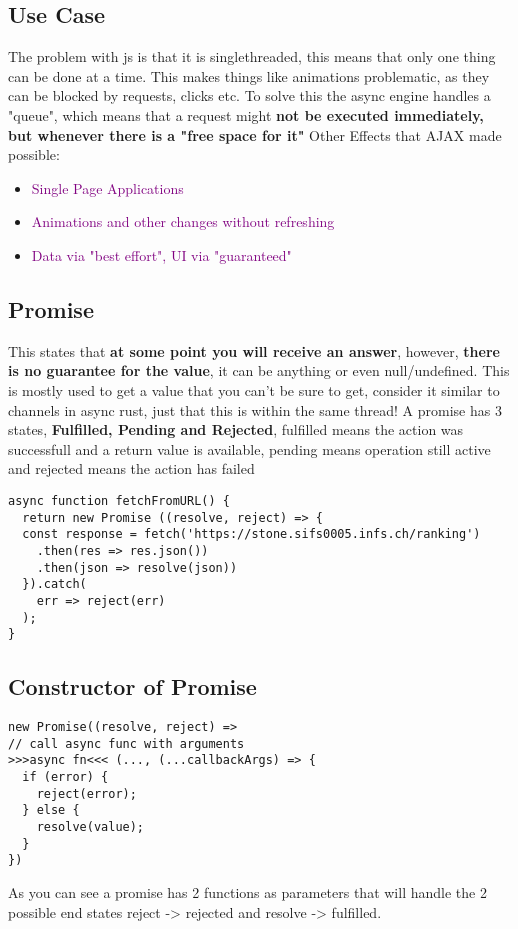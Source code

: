 \documentclass[main.tex,fontsize=6pt,paper=a4,paper=landscape,DIV=calc,]{scrartcl}
\begin{document}
\begin{multicols*}{4}
\subsection{Use Case}  
The problem with js is that it is singlethreaded, this means that only one thing can be done at a time.\newline
This makes things like animations problematic, as they can be blocked by requests, clicks etc.\newline
To solve this the async engine handles a "queue", which means that a request might \textbf{not be executed immediately, but whenever there is a "free space for it"}\newline
Other Effects that AJAX made possible:
\begin{itemize}
\item \textcolor{purple}{Single Page Applications}
\item \textcolor{purple}{Animations and other changes without refreshing}
\item \textcolor{purple}{Data via "best effort", UI via "guaranteed"}
\end{itemize} 

\subsection{Promise}  
This states that \textbf{at some point you will receive an answer}, however, \textbf{there is no guarantee for the value}, it can be anything or even null/undefined.\newline
This is mostly used to get a value that you can't be sure to get, consider it similar to channels in async rust, just that this is within the same thread!\newline
\textcolor{OliveGreen}{A promise has 3 states, \textbf{Fulfilled, Pending and Rejected}, fulfilled means the action was successfull and a return value is available, pending means operation still active and rejected means the action has failed}
\vspace{-2mm}
\begin{lstlisting}
async function fetchFromURL() {
  return new Promise ((resolve, reject) => {
  const response = fetch('https://stone.sifs0005.infs.ch/ranking')
    .then(res => res.json())
    .then(json => resolve(json))
  }).catch(
    err => reject(err)
  );
}
\end{lstlisting}
\vspace{2mm}

\subsection{Constructor of Promise}  
\vspace{-2mm}
\begin{lstlisting}
new Promise((resolve, reject) =>
// call async func with arguments
>>>async fn<<< (..., (...callbackArgs) => {
  if (error) {
    reject(error);
  } else {
    resolve(value);
  }
})
\end{lstlisting}
\vspace{2mm}
As you can see a promise has 2 functions as parameters that will handle the 2 possible end states reject -> rejected and resolve -> fulfilled.


\end{multicols*}
\end{document}
